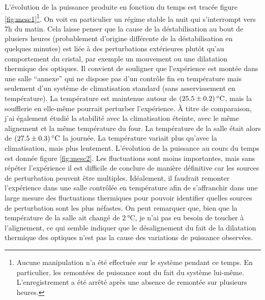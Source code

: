 \documentclass[11pt,a4paper]{article}
\begin{document}
L'évolution de la puissance produite en fonction du temps est tracée figure \ref{fig:mesc1}\footnote{Aucune manipulation n'a été effectuée sur le système pendant ce temps. En particulier, les remontées de puissance sont du fait du système lui-même. L'enregistrement a été arrêté après une absence de remontée sur plusieurs heures.}. On voit en particulier un régime stable la nuit qui s'interrompt vers 7h du matin. Cela laisse penser que la cause de la déstabilisation au bout de plusiers heures (probablement d'origine différente de la déstabilisation en quelques minutes) est liée à des perturbations extérieures plutôt qu'au comportement du cristal, par exemple un mouvement ou une dilatation thermique des optiques. Il convient de souligner que l'expérience est montée dans une salle ``annexe'' qui ne dispose pas d'un contrôle fin en température mais seulement d'un système de climatisation standard (sans asservissement en température). La température est maintenue autour de $\SI{25.5+-0.2}{\celsius}$, mais la soufflerie en elle-même pourrait perturber l'expérience. À titre de comparaison, j'ai également étudié la stabilité avec la climatisation éteinte, avec le même alignement et la même température du four. La température de la salle était alors de $\SI{27.5+-0.3}{\celsius}$ la journée. La température variait plus qu'avec la climatisation, mais plus lentement. L'évolution de la puissance au cours du temps est donnée figure \ref{fig:mesc2}. Les fluctuations sont moins importantes, mais sans répéter l'expérience il est difficile de conclure de manière définitive car les sources de perturbation peuvent être multiples. Idéalement, il faudrait remonter l'expérience dans une salle contrôlée en température afin de s'affranchir dans une large mesure des fluctuations thermiques pour pouvoir identifier quelles sources de perturbation sont les plus néfastes. On peut remarquer que, bien que la température de la salle ait changé de $\SI{2}{\celsius}$, je n'ai pas eu besoin de toucher à l'alignement, ce qui semble indiquer que le désalignement du fait de la dilatation thermique des optiques n'est pas la cause des variations de puissance observées.
\end{document}
